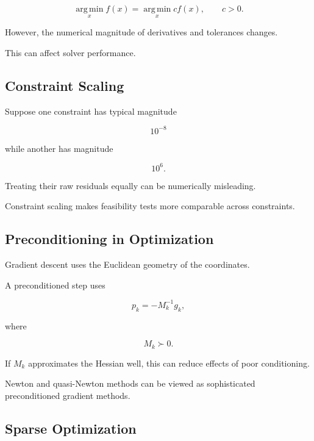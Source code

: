 \[
\boxed{
\operatorname*{arg\,min}_x f(x)
=
\operatorname*{arg\,min}_x cf(x),
\qquad
c>0.
}
\]

However, the numerical magnitude of derivatives and tolerances changes.

This can affect solver performance.

\subsection{Constraint Scaling}
\label{subsec:constraint-scaling}

Suppose one constraint has typical magnitude

\[
10^{-8}
\]

while another has magnitude

\[
10^6.
\]

Treating their raw residuals equally can be numerically misleading.

Constraint scaling makes feasibility tests more comparable across
constraints.

\subsection{Preconditioning in Optimization}
\label{subsec:optimization-preconditioning}

Gradient descent uses the Euclidean geometry of the coordinates.

A preconditioned step uses

\[
\boxed{
p_k
=
-
M_k^{-1}g_k,
}
\]

where

\[
M_k\succ0.
\]

If \(M_k\) approximates the Hessian well, this can reduce effects of poor
conditioning.

Newton and quasi-Newton methods can be viewed as sophisticated
preconditioned gradient methods.

\subsection{Sparse Optimization}
\label{subsec:sparse-numerical-optimization}

